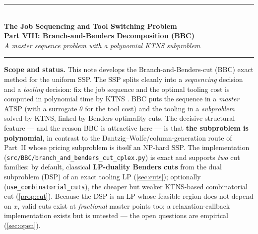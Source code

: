 \documentclass[11pt,a4paper]{article}
\theoremstyle{plain}
\theoremstyle{definition}
\begin{document}
\begin{center}
  {\color{navyblue}\rule{\textwidth}{2pt}}\\[0.4cm]
  {\LARGE\bfseries\color{navyblue}The Job Sequencing and Tool Switching Problem}\\[0.2cm]
  {\large\bfseries\color{navyblue}Part VIII: Branch-and-Benders Decomposition (BBC)}\\[0.1cm]
  {\large\itshape\color{midblue}A master sequence problem with a polynomial KTNS subproblem}\\[0.3cm]
  {\color{navyblue}\rule{\textwidth}{2pt}}
\end{center}

\vspace{0.3cm}
\begin{mdframed}[backgroundcolor=lightblue,linecolor=navyblue,linewidth=1pt,
  innerleftmargin=14pt,innerrightmargin=14pt,innertopmargin=8pt,innerbottommargin=8pt]
\small\textbf{Scope and status.}
This note develops the Branch-and-Benders-cut (BBC) exact method for the uniform SSP. The
SSP splits cleanly into a \emph{sequencing} decision and a \emph{tooling} decision: fix the
job sequence and the optimal tooling cost is computed in polynomial time by KTNS
\cite{Tang1988}. BBC puts the sequence in a \emph{master} ATSP (with a surrogate
$\theta$ for the tool cost) and the tooling in a \emph{subproblem} solved by KTNS, linked by
Benders optimality cuts. The decisive structural feature --- and the reason BBC is
attractive here --- is that \textbf{the subproblem is polynomial}, in contrast to the
Dantzig--Wolfe/column-generation route of Part~II whose pricing subproblem is itself an
NP-hard SSP.
The implementation (\texttt{src/BBC/branch\_and\_benders\_cut\_cplex.py}) is exact and
supports \emph{two} cut families: by default, classical \textbf{LP-duality Benders cuts}
from the dual subproblem (DSP) of an exact tooling LP (\cref{sec:cuts}); optionally
(\texttt{use\_combinatorial\_cuts}), the cheaper but weaker KTNS-based combinatorial cut
(\cref{prop:cut}). Because the DSP is an LP whose feasible region does not depend on
$x$, valid cuts exist at \emph{fractional} master points too; a relaxation-callback
implementation exists but is untested --- the open questions are empirical
(\cref{sec:open}).
\end{mdframed}
\end{document}
